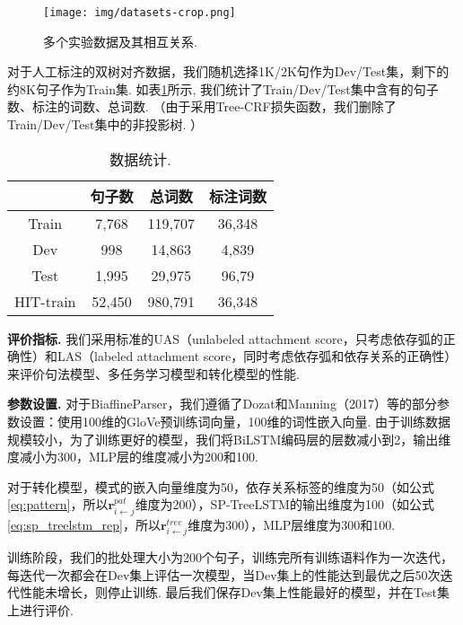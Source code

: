 \begin{figure}[hb!]
    \centering
    \texttt{[image: img/datasets-crop.png]}
    \caption{多个实验数据及其相互关系. }
    \label{fig:datasets}
\end{figure}

对于人工标注的双树对齐数据，我们随机选择1K/2K句作为Dev/Test集，剩下的约8K句子作为Train集. 如表\ref{tb:HIT-split}所示, 我们统计了Train/Dev/Test集中含有的句子数、标注的词数、总词数. %
（由于采用Tree-CRF损失函数，我们删除了Train/Dev/Test集中的非投影树. ）

\begin{table}[hb!]
    \centering
    \caption{数据统计. }
    \label{tb:HIT-split}
    \begin{tabular}{cccc}
        \toprule
                  & 句子数 & 总词数  & 标注词数 \\
        \midrule
        Train     & 7,768  & 119,707 & 36,348   \\ %
        Dev       & 998    & 14,863  & 4,839    \\ %
        Test      & 1,995  & 29,975  & 96,79    \\
        \midrule
        HIT-train & 52,450 & 980,791 & 36,348   \\
        \bottomrule
    \end{tabular}
\end{table}

\textbf{评价指标.  } 我们采用标准的UAS（unlabeled attachment score，只考虑依存弧的正确性）和LAS（labeled attachment score，同时考虑依存弧和依存关系的正确性）来评价句法模型、多任务学习模型和转化模型的性能.

\textbf{参数设置.  } 对于BiaffineParser，我们遵循了Dozat和Manning（2017）等的部分参数设置：使用100维的GloVe预训练词向量，100维的词性嵌入向量. 由于训练数据规模较小，为了训练更好的模型，我们将BiLSTM编码层的层数减小到2，输出维度减小为300，MLP层的维度减小为200和100.

对于转化模型，模式的嵌入向量维度为50，依存关系标签的维度为50（如公式\ref{eq:pattern}，所以$\mathbf{r}^{pat}_{i \leftarrow j}$维度为200），SP-TreeLSTM的输出维度为100（如公式\ref{eq:sp_treelstm_rep}，所以$\mathbf{r}^{tree}_{i \leftarrow j}$维度为300），MLP层维度为300和100.

训练阶段，我们的批处理大小为200个句子，训练完所有训练语料作为一次迭代，每迭代一次都会在Dev集上评估一次模型，当Dev集上的性能达到最优之后50次迭代性能未增长，则停止训练. 最后我们保存Dev集上性能最好的模型，并在Test集上进行评价.

